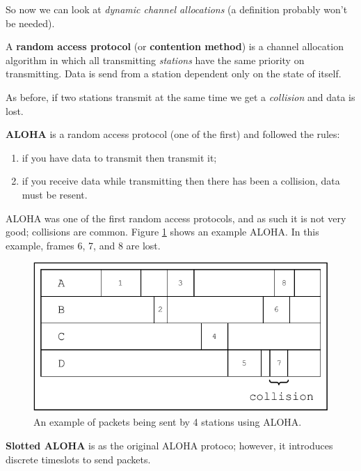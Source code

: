 So now we can look at \emph{dynamic channel allocations} (a definition probably won't be needed).

\begin{definition}
    A \textbf{random access protocol} (or \textbf{contention method}) is a channel allocation algorithm in which all transmitting \emph{stations} have the same priority on transmitting. Data is send from a station dependent only on the state of itself. 
\end{definition}

As before, if two stations transmit at the same time we get a \emph{collision} and data is lost.

\begin{example}[ALOHA]
    \textbf{ALOHA} is a random access protocol (one of the first) and followed the rules:
    \begin{enumerate}
        \item if you have data to transmit then transmit it;
        \item if you receive data while transmitting then there has been a collision, data must be resent.
    \end{enumerate}
\end{example}

ALOHA was one of the first random access protocols, and as such it is not very good; collisions are common. Figure \ref{fig:aloha} shows an example ALOHA. In this example, frames 6, 7, and 8 are lost.

\begin{figure}
    \centering
    \includegraphics[width=0.8\linewidth]{images/aloha.pdf}
    \caption{An example of packets being sent by 4 stations using ALOHA.}
    \label{fig:aloha}
\end{figure}

\begin{example}
    \textbf{Slotted ALOHA} is as the original ALOHA protoco; however, it introduces discrete timeslots to send packets.
\end{example}

